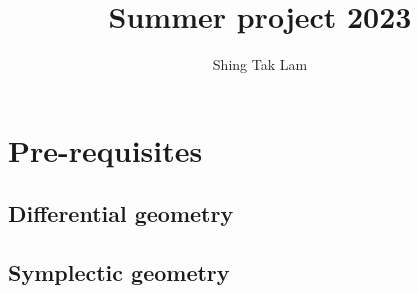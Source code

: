 \documentclass{report}
\title{Summer project 2023}
\author{Shing Tak Lam}
\begin{document}
\maketitle

\tableofcontents

\part{Pre-requisites}

\chapter{Differential geometry}










\chapter{Symplectic geometry}






\end{document}
